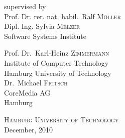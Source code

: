 \documentclass[12pt,a4paper]{extreport}
\begin{document}
\begin{titlepage}
\begin{minipage}[b]{1\linewidth}
\begin{flushleft}
supervised by\\
\medskip
\large
Prof. Dr. rer. nat. habil.~Ralf \textsc{M\"oller}\\
Dipl. Ing. Sylvia \textsc{Melzer}\\
\normalsize 
Software Systems Institute\\
\medskip

\large Prof. Dr.~Karl-Heinz \textsc{Zimmermann}\\
\normalsize Institute of Computer Technology\\
Hamburg University of Technology\\

\bigskip
\bigskip
\large
Dr.~Michael \textsc{Fritsch}\\
\normalsize 
CoreMedia AG\\
Hamburg\\



\end{flushleft}


\begin{center}
\bigskip
\large
\textsc{Hamburg University of Technology}\\
{\large December, 2010} 
\end{center} 

\end{minipage}

\end{titlepage}

%

{\renewcommand{\thepage}{}

%
}


\makeatletter
\renewcommand{\fnum@figure}{\textbf{Figure~\thefigure}}
\makeatother

\tableofcontents
{}
\listoffigures
\listofalgorithms







%
\printglossaries


\begin{appendix}


\end{appendix}

% 


\end{document}
